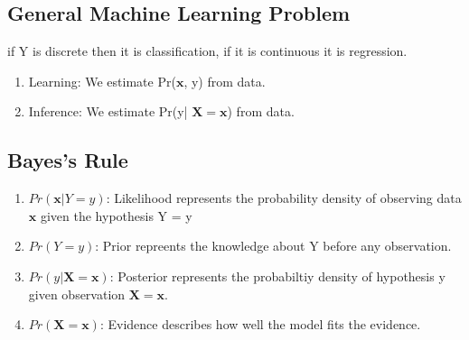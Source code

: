 \documentclass[12pt]{article}
\numberwithin{equation}{section}
\begin{document}
\subsection{General Machine Learning Problem}
if Y is discrete then it is classification, if it is continuous it is regression.
\begin{enumerate}
    \item Learning: We estimate Pr($\bm{x}$, y) from data.
    \item Inference: We estimate Pr(y| $\bm{X} = \bm{x}$) from data.
\end{enumerate}
\subsection{Bayes's Rule}
\begin{enumerate}
    \item $Pr(\bm{x} | Y = y)$: Likelihood represents the probability density of observing data $\bm{x}$ given the hypothesis Y = y
    \item $Pr(Y = y)$: Prior repreents the knowledge about Y before any observation.
    \item $Pr(y | \bm{X} = \bm{x})$: Posterior represents the probabiltiy density of hypothesis y given observation $\bm{X} = \bm{x}$.
    \item $Pr(\bm{X} = \bm{x})$: Evidence describes how well the model fits the evidence.
\end{enumerate}
\end{document}

